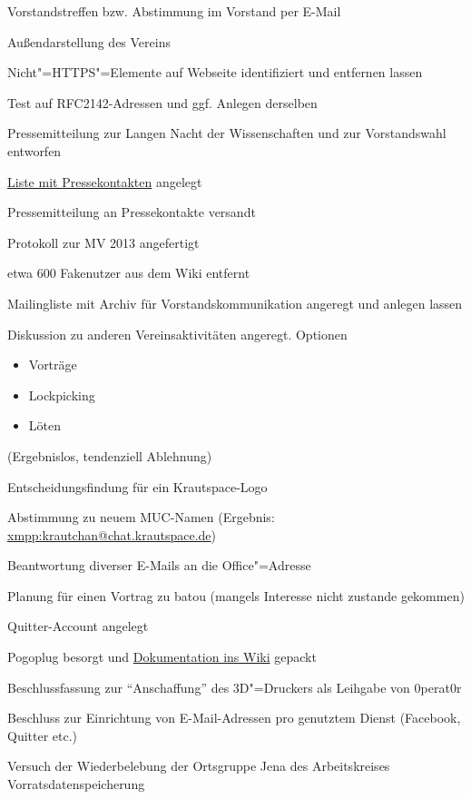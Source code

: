 \documentclass[ngerman]{scrartcl}
\begin{document}
\begin{compactitem}
\item Vorstandstreffen bzw. Abstimmung im Vorstand per E-Mail
\item Außendarstellung des Vereins
\item Nicht"=HTTPS"=Elemente auf Webseite identifiziert und entfernen
  lassen
\item Test auf RFC2142-Adressen und ggf. Anlegen derselben
\item Pressemitteilung zur Langen Nacht der Wissenschaften und zur
  Vorstandswahl entworfen
\item \href{https://www.krautspace.de/presse#pressekontakte}{Liste mit
    Pressekontakten} angelegt
\item Pressemitteilung an Pressekontakte versandt
\item Protokoll zur MV 2013 angefertigt
\item etwa 600 Fakenutzer aus dem Wiki entfernt
\item Mailingliste mit Archiv für Vorstandskommunikation angeregt und
  anlegen lassen
\item Diskussion zu anderen Vereinsaktivitäten angeregt. Optionen
  \begin{itemize}
  \item Vorträge
  \item Lockpicking
  \item Löten
  \end{itemize} (Ergebnislos, tendenziell Ablehnung)
\item Entscheidungsfindung für ein Krautspace-Logo
\item Abstimmung zu neuem MUC-Namen (Ergebnis:
  \url{xmpp:krautchan@chat.krautspace.de})
\item Beantwortung diverser E-Mails an die Office"=Adresse
\item Planung für einen Vortrag zu batou (mangels Interesse nicht
  zustande gekommen)
\item Quitter-Account angelegt
\item Pogoplug besorgt und
  \href{https://www.krautspace.de/hswiki:projekte:pogoplug}{Dokumentation
    ins Wiki} gepackt
\item Beschlussfassung zur "`Anschaffung"' des 3D"=Druckers als
  Leihgabe von 0perat0r
\item Beschluss zur Einrichtung von E-Mail-Adressen pro genutztem
  Dienst (Facebook, Quitter etc.)
\item Versuch der Wiederbelebung der Ortsgruppe Jena des
  Arbeitskreises Vorratsdatenspeicherung

\end{compactitem}
\end{document}
